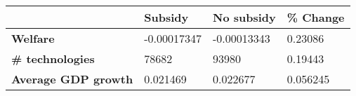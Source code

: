 \begin{tabular}{|l|l|l|l|}
\hline
&\textbf{Subsidy}&\textbf{No subsidy}&\textbf{\% Change}\\\hline
\textbf{Welfare}&-0.00017347&-0.00013343&0.23086\\\hline
\textbf{\# technologies}&78682&93980&0.19443\\\hline
\textbf{Average GDP growth}&0.021469&0.022677&0.056245\\\hline
\end{tabular}
